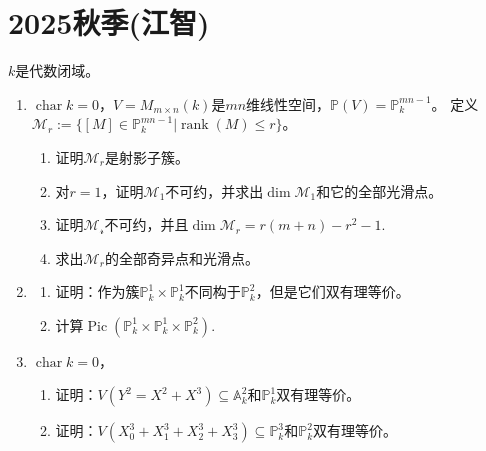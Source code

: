 
\section{2025秋季(江智)}

$k$是代数闭域。

\begin{enumerate}
\item $\operatorname{char}k=0$，$V=M_{m\times n}(k)$是$mn$维线性空间，$\mathbb{P}(V)=\mathbb{P}^{mn-1}_k$。
定义$\mathcal{M}_r:=\{[M]\in\mathbb{P}^{mn-1}_k | \operatorname{rank}(M)\leqslant r\}$。
\begin{enumerate}
    \item[(1)] 证明$\mathcal{M}_r$是射影子簇。
    \item[(2)] 对$r=1$，证明$\mathcal{M}_1$不可约，并求出$\dim\mathcal{M}_1$和它的全部光滑点。
    \item[(3)] 证明$\mathcal{M_r}$不可约，并且$\dim\mathcal{M}_r=r(m+n)-r^2-1$.
    \item[(4)] 求出$\mathcal{M}_r$的全部奇异点和光滑点。
\end{enumerate}

\item 
\begin{enumerate}
\item [(1)] 证明：作为簇$\mathbb{P}^1_k\times \mathbb{P}^1_k$不同构于$\mathbb{P}^2_k$，但是它们双有理等价。
\item[(2)] 计算$\operatorname{Pic}(\mathbb{P}^1_k\times\mathbb{P}^1_k\times\mathbb{P}^2_k)$.
\end{enumerate}

\item $\operatorname{char}k=0$，
\begin{enumerate}
\item[(1)] 证明：$V(Y^2=X^2+X^3)\subseteq\mathbb{A}^2_k$和$\mathbb{P}^1_k$双有理等价。
\item[(2)] 证明：$V(X_0^3+X_1^3+X_2^3+X_3^3)\subseteq\mathbb{P}^3_k$和$\mathbb{P}^2_k$双有理等价。
\end{enumerate}
\end{enumerate}



